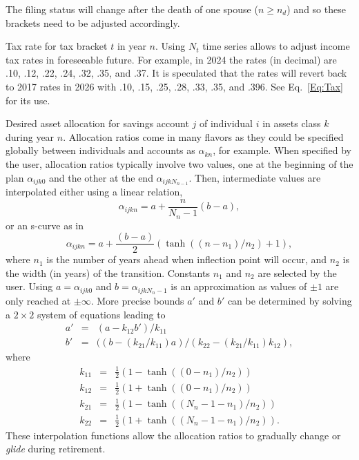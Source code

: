\documentclass{article}[fleqn,12pt]
\begin{document}
\begin{description}[leftmargin=4em,style=multiline]
	The filing status will change after the death of one spouse ($n \ge n_d$) and so these
	brackets need to be adjusted accordingly.
\item [$\theta_{tn}$]
	Tax rate for tax bracket $t$ in year $n$. Using $N_t$ time series allows to adjust income
	tax rates in foreseeable future.
	For example, in 2024 the rates (in decimal) are .10, .12, .22, .24, .32, .35, and .37.
	It is speculated that the rates will revert back to 2017 rates in 2026 with
	.10, .15, .25, .28, .33, .35, and .396. See Eq.~\ref{Eq:Tax} for its use.
\item [$\alpha_{ijkn}$]
	Desired asset allocation for savings account $j$ of individual $i$ in assets class $k$ during year $n$.
	Allocation ratios come in many flavors as they could be specified globally between
	individuals and accounts as $\alpha_{kn}$, for example.
	When specified by the user, allocation ratios typically involve two values, one at the
	beginning of the plan $\alpha_{ijk0}$ and the other at the end
	$\alpha_{ijkN_{n-1}}$. Then, intermediate values are interpolated either using
	a linear relation,
\begin{equation}
	\alpha_{ijkn} = a + \frac{n}{N_n - 1} (b - a),
\end{equation}
or an s-curve as in
\begin{equation}
	\alpha_{ijkn} = a + \frac{(b - a)}{2}
	(\tanh((n-n_1)/n_2) + 1),
\end{equation}
	where $n_1$ is the number of years ahead when inflection point will occur, and $n_2$ is the
	width (in years) of the transition. Constants $n_1$ and $n_2$ are selected by the user.
	Using $a = \alpha_{ijk0}$ and $b = \alpha_{ijkN_n-1}$ is an approximation as values of $\pm 1$
	are only reached at $\pm \infty$.
	More precise bounds $a'$ and $b'$ can be determined by solving a $2\times 2$ system
	of equations leading to
	\begin{eqnarray}
		a' &=& (a - k_{12}b')/k_{11} \nonumber \\
		b' &=& ((b - (k_{21}/k_{11})a)/(k_{22} - (k_{21}/k_{11})k_{12}),
	\end{eqnarray}
	where
	\begin{eqnarray}
		k_{11} &=& \frac{1}{2}(1 - \tanh((0-n_1)/n_2)) \nonumber \\
		k_{12} &=& \frac{1}{2}(1 + \tanh((0-n_1)/n_2)) \nonumber \\
		k_{21} &=& \frac{1}{2}(1 - \tanh((N_n-1-n_1)/n_2)) \nonumber \\
		k_{22} &=& \frac{1}{2}(1 + \tanh((N_n-1-n_1)/n_2)).
	\end{eqnarray}
	These interpolation functions allow the allocation ratios to gradually change
	or {\em glide} during retirement.


\end{description}
\end{document}

